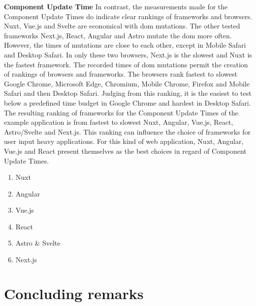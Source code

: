 \documentclass[a4paper, 12pt]{article}
\begin{document}
\textbf{Component Update Time} In contrast, the measurements made for the Component Update Times do indicate clear rankings of frameworks and browsers.
Nuxt, Vue.js and Svelte are economical with \acrshort{dom} mutations.
The other tested frameworks Next.js, React, Angular and Astro mutate the \acrshort{dom} more often.
However, the times of mutations are close to each other, except in Mobile Safari and Desktop Safari.
In only these two browsers, Next.js is the slowest and Nuxt is the fastest framework.
The recorded times of \acrshort{dom} mutations permit the creation of rankings of browsers and frameworks.
The browsers rank fastest to slowest Google Chrome, Microsoft Edge, Chromium, Mobile Chrome, Firefox and Mobile Safari and then Desktop Safari.
Judging from this ranking, it is the easiest to test below a predefined time budget in Google Chrome and hardest in Desktop Safari.
The resulting ranking of frameworks for the Component Update Times of the example application is from fastest to slowest Nuxt, Angular, Vue.js, React, Astro/Svelte and Next.js.
This ranking can influence the choice of frameworks for user input heavy applications.
For this kind of web application, Nuxt, Angular, Vue.js and React present themselves as the best choices in regard of Component Update Times.
\begin{center}
\begin{varwidth}{\textwidth}
\begin{enumerate}
  \item Nuxt
  \item Angular
  \item Vue.js
  \item React
  \item Astro \& Svelte
  \item Next.js
\end{enumerate}
\end{varwidth}
\end{center}

\section{Concluding remarks}\label{sec:conclusion}
\end{document}
